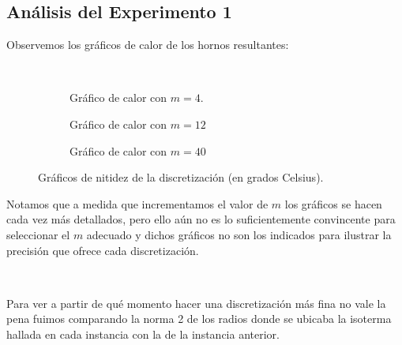 \subsection{Análisis del Experimento 1}

Observemos los gráficos de calor de los hornos resultantes:

\
\begin{figure}[h]
    \centering
    \begin{subfigure}{0.3\linewidth}
        \centering
        
        \caption{Gráfico de calor con $m = 4$.}
        \label{fig:D1_4_40}
    \end{subfigure}
    \hfill
    \begin{subfigure}{0.3\linewidth}
        \centering
        
        \caption{Gráfico de calor con $m = 12$}
        \label{fig:D1_12_40}
    \end{subfigure}
    \hfill
    \begin{subfigure}{0.3\linewidth}
        \centering
        
        \caption{Gráfico de calor con $m = 40$}
        \label{fig:D1_50_100}
    \end{subfigure}
    \caption{Gráficos de nitidez de la discretización (en grados Celsius).}
    \label{fig:D1_nitidez}
\end{figure}


Notamos que a medida que incrementamos el valor de $m$ los gráficos se hacen cada vez más detallados, pero ello aún no es lo suficientemente convincente para seleccionar el $m$ adecuado y dichos gráficos no son los indicados para ilustrar la precisión que ofrece cada discretización. 

\

Para ver a partir de qué momento hacer una discretización más fina no vale la pena fuimos comparando la norma 2 de los radios donde se ubicaba la isoterma hallada en cada instancia con la de la instancia anterior. 

